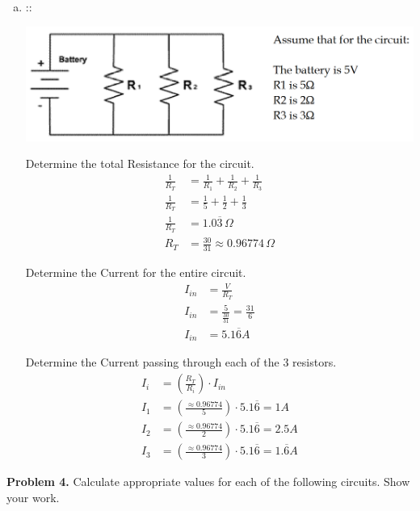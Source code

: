 \documentclass[11pt]{article}
\begin{document}
\begin{enumerate}[a)]
\pagebreak
\item ::
\begin{center}
    \includegraphics[scale=0.2]{3b.png}
\end{center}
Determine the total Resistance for the circuit.
\begin{align*}
    \frac{1}{R_T} &= \frac{1}{R_1} + \frac{1}{R_2} + \frac{1}{R_3} \\
    \frac{1}{R_T} &= \frac{1}{5} + \frac{1}{2} + \frac{1}{3} \\
    \frac{1}{R_T} &= 1.0\overline{3}\,\Omega \\
    R_T &= \frac{30}{31} \approx 0.96774\,\Omega
\end{align*}

Determine the Current for the entire circuit.
\begin{align*}
    I_{in} &= \frac{V}{R_T} \\
    I_{in} &= \frac{5}{\frac{30}{31}} = \frac{31}{6}\\
    I_{in} &= 5.1\overline{6}A
\end{align*}

Determine the Current passing through each of the 3 resistors.
\begin{align*}
    I_i &= \left(\frac{R_T}{R_i}\right)\cdot I_{in} \\
    I_1 &= \left(\frac{\approx0.96774}{5}\right)\cdot 5.1\overline{6} = 1A \\
    I_2 &= \left(\frac{\approx0.96774}{2}\right)\cdot 5.1\overline{6} = 2.5A \\
    I_3 &= \left(\frac{\approx0.96774}{3}\right)\cdot 5.1\overline{6} = 1.\overline{6}A
\end{align*}

\end{enumerate}
\pagebreak


\textbf{Problem 4.} Calculate appropriate values for each of the following
circuits. Show your work.
\end{document}
